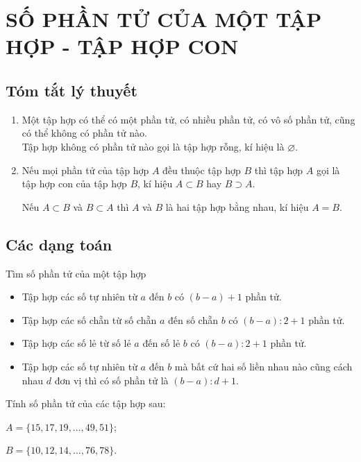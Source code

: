 \section{SỐ PHẦN TỬ CỦA MỘT TẬP HỢP - TẬP HỢP CON}
\subsection{Tóm tắt lý thuyết}
	\begin{enumerate}
		\item Một tập hợp có thể có một phần tử, có nhiều phần tử, có vô số phần tử, cũng có thể không có phần tử nào.\\
				Tập hợp không có phần tử nào gọi là tập hợp rỗng, kí hiệu là $\varnothing$.
		\item Nếu mọi phần tử của tập hợp $A$ đều thuộc tập hợp $B$ thì tập hợp $A$ gọi là tập hợp con của tập hợp $B$, kí hiệu $A \subset B$ hay $B \supset A$.
				\begin{note}
					Nếu $A \subset B$ và $B \subset A$ thì $A$ và $B$ là hai tập hợp bằng nhau, kí hiệu $A = B$.
				\end{note}
	\end{enumerate}
\subsection{Các dạng toán}
	\begin{dang}{Tìm số phần tử của một tập hợp}
		\begin{itemize}
			\item Tập hợp các số tự nhiên từ $a$ đến $b$ có $(b - a) + 1$ phần tử.
			\item Tập hợp các số chẵn từ số chẵn $a$ đến số chẵn $b$ có $(b - a):2 + 1$ phần tử.
			\item Tập hợp các số lẻ từ số lẻ $a$ đến số lẻ $b$ có $(b - a):2 + 1$ phần tử.
			\item Tập hợp các số tự nhiên từ $a$ đến $b$ mà bất cứ hai số liền nhau nào cũng cách nhau $d$ đơn vị thì có số phần tử là $(b - a):d + 1$.
		\end{itemize}
	\end{dang}
	
\begin{vd}%
	Tính số phần tử của các tập hợp sau:
	\begin{enumEX}{2}
		\item $A = \{15, 17, 19, \ldots, 49, 51\}$;
		\item $B = \{10, 12, 14, \ldots, 76, 78\}$.
	\end{enumEX}
\end{vd}

